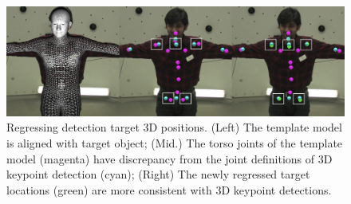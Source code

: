 

\begin{figure}[t]    
\centering
	\includegraphics[width=0.9\columnwidth]{tbc_figures/Jointregression_detectionTarget_nospace}    
	\caption{Regressing detection target 3D positions. (Left) The template model is aligned with target object; (Mid.) The torso joints of the template model (magenta) have discrepancy from the joint definitions of 3D keypoint detection (cyan); (Right) The newly regressed target locations (green) are more consistent with 3D keypoint detections.}
	\label{fig:jointRegression}
\end{figure}
%
%

